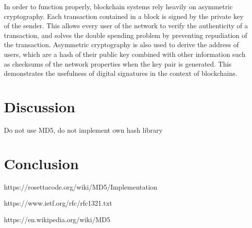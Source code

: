 \documentclass{article}
\begin{document}
\bigskip

In order to function properly, blockchain systems rely heavily on asymmetric cryptography. Each transaction contained in a block is signed by the private key of the sender. This allows every user of the network to verify the authenticity of a transaction, and solves the double spending problem by preventing repudiation of the transaction. Asymmetric cryptography is also used to derive the address of users, which are a hash of their public key combined with other information such as checksums of the network properties when the key pair is generated. This demonstrates the usefulness of digital signatures in the context of blockchains.


\section{Discussion}

Do not use MD5, do not implement own hash library

\section{Conclusion}


\bigskip





https://rosettacode.org/wiki/MD5/Implementation

https://www.ietf.org/rfc/rfc1321.txt  

https://en.wikipedia.org/wiki/MD5  
\end{document}

